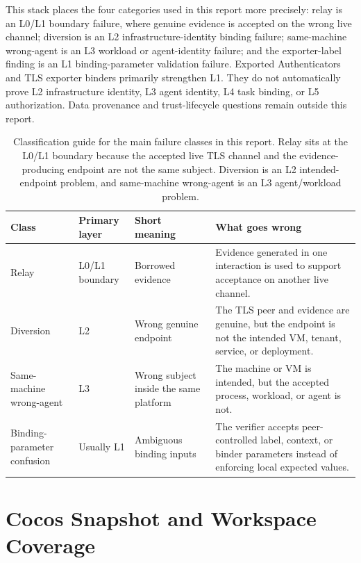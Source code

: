 \documentclass[11pt,a4paper]{article}
\begin{document}
\noindent
This stack places the four categories used in this report more precisely:
relay is an L0/L1 boundary failure, where genuine evidence is accepted on the
wrong live channel; diversion is an L2 infrastructure-identity binding failure;
same-machine wrong-agent is an L3 workload or agent-identity failure; and the
exporter-label finding is an L1 binding-parameter validation failure.
Exported Authenticators and TLS exporter binders primarily strengthen L1. They
do not automatically prove L2 infrastructure identity, L3 agent identity, L4
task binding, or L5 authorization. Data provenance and trust-lifecycle
questions remain outside this report.

\begin{table}[H]
\centering
\footnotesize
\begin{tabularx}{\textwidth}{@{}>{\raggedright\arraybackslash}p{}>{\raggedright\arraybackslash}p{}>{\raggedright\arraybackslash}p{}>{\raggedright\arraybackslash}X@{}}
\toprule
\textbf{Class} & \textbf{Primary layer} & \textbf{Short meaning} & \textbf{What goes wrong} \\
\midrule
Relay & L0/L1 boundary & Borrowed evidence & Evidence generated in one interaction is used to support acceptance on another live channel. \\
Diversion & L2 & Wrong genuine endpoint & The TLS peer and evidence are genuine, but the endpoint is not the intended VM, tenant, service, or deployment. \\
Same-machine wrong-agent & L3 & Wrong subject inside the same platform & The machine or VM is intended, but the accepted process, workload, or agent is not. \\
Binding-parameter confusion & Usually L1 & Ambiguous binding inputs & The verifier accepts peer-controlled label, context, or binder parameters instead of enforcing local expected values. \\
\bottomrule
\end{tabularx}
\caption{Classification guide for the main failure classes in this report. Relay sits at the L0/L1 boundary because the accepted live TLS channel and the evidence-producing endpoint are not the same subject. Diversion is an L2 intended-endpoint problem, and same-machine wrong-agent is an L3 agent/workload problem.}
\label{tab:failure-classification}
\end{table}

\newpage
\section{Cocos Snapshot and Workspace Coverage}
\label{app:coverage}
\end{document}
